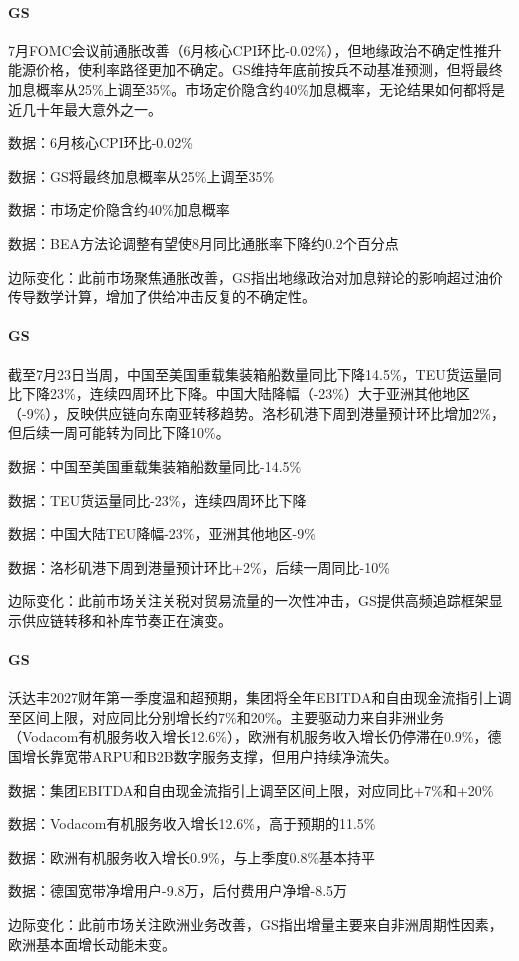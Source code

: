 \documentclass[11pt]{ctexart}
\begin{document}
\paragraph{GS} 7月FOMC会议前通胀改善（6月核心CPI环比-0.02\%），但地缘政治不确定性推升能源价格，使利率路径更加不确定。GS维持年底前按兵不动基准预测，但将最终加息概率从25\%上调至35\%。市场定价隐含约40\%加息概率，无论结果如何都将是近几十年最大意外之一。
{\small\color{refgray}数据：6月核心CPI环比-0.02\%\par}
{\small\color{refgray}数据：GS将最终加息概率从25\%上调至35\%\par}
{\small\color{refgray}数据：市场定价隐含约40\%加息概率\par}
{\small\color{refgray}数据：BEA方法论调整有望使8月同比通胀率下降约0.2个百分点\par}
{\small\color{refgray}边际变化：此前市场聚焦通胀改善，GS指出地缘政治对加息辩论的影响超过油价传导数学计算，增加了供给冲击反复的不确定性。\par}
\paragraph{GS} 截至7月23日当周，中国至美国重载集装箱船数量同比下降14.5\%，TEU货运量同比下降23\%，连续四周环比下降。中国大陆降幅（-23\%）大于亚洲其他地区（-9\%），反映供应链向东南亚转移趋势。洛杉矶港下周到港量预计环比增加2\%，但后续一周可能转为同比下降10\%。
{\small\color{refgray}数据：中国至美国重载集装箱船数量同比-14.5\%\par}
{\small\color{refgray}数据：TEU货运量同比-23\%，连续四周环比下降\par}
{\small\color{refgray}数据：中国大陆TEU降幅-23\%，亚洲其他地区-9\%\par}
{\small\color{refgray}数据：洛杉矶港下周到港量预计环比+2\%，后续一周同比-10\%\par}
{\small\color{refgray}边际变化：此前市场关注关税对贸易流量的一次性冲击，GS提供高频追踪框架显示供应链转移和补库节奏正在演变。\par}
\paragraph{GS} 沃达丰2027财年第一季度温和超预期，集团将全年EBITDA和自由现金流指引上调至区间上限，对应同比分别增长约7\%和20\%。主要驱动力来自非洲业务（Vodacom有机服务收入增长12.6\%），欧洲有机服务收入增长仍停滞在0.9\%，德国增长靠宽带ARPU和B2B数字服务支撑，但用户持续净流失。
{\small\color{refgray}数据：集团EBITDA和自由现金流指引上调至区间上限，对应同比+7\%和+20\%\par}
{\small\color{refgray}数据：Vodacom有机服务收入增长12.6\%，高于预期的11.5\%\par}
{\small\color{refgray}数据：欧洲有机服务收入增长0.9\%，与上季度0.8\%基本持平\par}
{\small\color{refgray}数据：德国宽带净增用户-9.8万，后付费用户净增-8.5万\par}
{\small\color{refgray}边际变化：此前市场关注欧洲业务改善，GS指出增量主要来自非洲周期性因素，欧洲基本面增长动能未变。\par}
\end{document}
